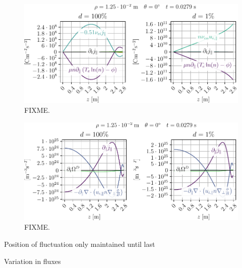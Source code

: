 %
\begin{figure}[htb]
    \centering
    \includegraphics{fig/results/neutral/jParBalanceNnComparePar}
    \caption{FIXME.}
    \label{fig:nnScanJParPar}
\end{figure}
%
%
\begin{figure}[htb]
    \centering
    \includegraphics{fig/results/neutral/vortDBalanceNnComparePar}
    \caption{FIXME.}
    \label{fig:nnScanVortDPar}
\end{figure}
%














Position of fluctuation only maintained until last

Variation in fluxes























